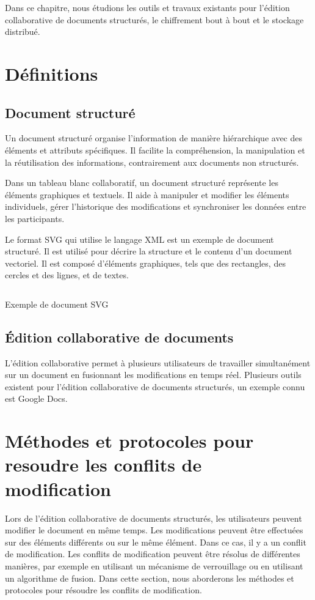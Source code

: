 Dans ce chapitre, nous étudions les outils et travaux existants pour l'édition collaborative de documents structurés, le chiffrement bout à bout et le stockage distribué.

\section{Définitions}
\subsection{Document structuré}
Un document structuré organise l'information de manière hiérarchique avec des éléments et attributs spécifiques. Il facilite la compréhension, la manipulation et la réutilisation des informations, contrairement aux documents non structurés.

Dans un tableau blanc collaboratif, un document structuré représente les éléments graphiques et textuels. Il aide à manipuler et modifier les éléments individuels, gérer l'historique des modifications et synchroniser les données entre les participants.

Le format SVG qui utilise le langage XML est un exemple de document structuré. Il est utilisé pour décrire la structure et le contenu d'un document vectoriel. Il est composé d'éléments graphiques, tels que des rectangles, des cercles et des lignes, et de textes.

\begin{listing}[H]
    \inputminted{XML}{assets/figure/svg-example.svg}
    \caption{Exemple de document SVG \label{fig:svg-example}}
\end{listing}

\subsection{Édition collaborative de documents}
L'édition collaborative permet à plusieurs utilisateurs de travailler simultanément sur un document en fusionnant les modifications en temps réel.
Plusieurs outils existent pour l'édition collaborative de documents structurés, un exemple connu est Google Docs.

\section{Méthodes et protocoles pour resoudre les conflits de modification}
Lors de l'édition collaborative de documents structurés, les utilisateurs peuvent modifier le document en même temps. Les modifications peuvent être effectuées sur des éléments différents ou sur le même élément. Dans ce cas, il y a un conflit de modification. Les conflits de modification peuvent être résolus de différentes manières, par exemple en utilisant un mécanisme de verrouillage ou en utilisant un algorithme de fusion. Dans cette section, nous aborderons les méthodes et protocoles pour résoudre les conflits de modification.

